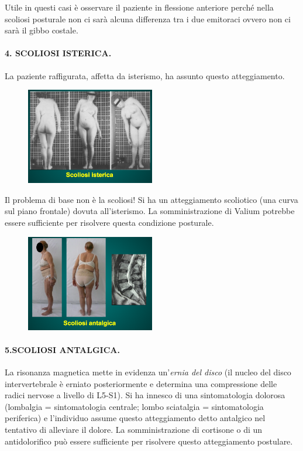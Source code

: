 Utile in questi casi è osservare il paziente in flessione anteriore
perché nella scoliosi posturale non ci sarà alcuna differenza tra i due
emitoraci ovvero non ci sarà il gibbo costale.

\paragraph{4. SCOLIOSI ISTERICA.}


La paziente raffigurata, affetta da isterismo, ha assunto questo
atteggiamento.

\begin{figure}[!ht]
\centering
	\includegraphics[width=0.5\textwidth]{012/image3.png}
\end{figure}

Il problema di base non è la scoliosi! Si ha un atteggiamento scoliotico
(una curva sul piano frontale) dovuta all'isterismo. La somministrazione
di Valium potrebbe essere sufficiente per risolvere questa condizione
posturale.

\begin{figure}[!ht]
\centering
	\includegraphics[width=0.5\textwidth]{012/image4.png}
\end{figure}

\paragraph{5.SCOLIOSI ANTALGICA.}


La risonanza magnetica mette in evidenza un'\emph{ernia del disco} (il
nucleo del disco intervertebrale è erniato posteriormente e determina
una compressione delle radici nervose a livello di L5-S1). Si ha innesco
di una sintomatologia dolorosa (lombalgia = sintomatologia centrale;
lombo sciatalgia = sintomatologia periferica) e l'individuo assume
questo atteggiamento detto antalgico nel tentativo di alleviare il
dolore. La somministrazione di cortisone o di un antidolorifico può
essere sufficiente per risolvere questo atteggiamento postulare.

